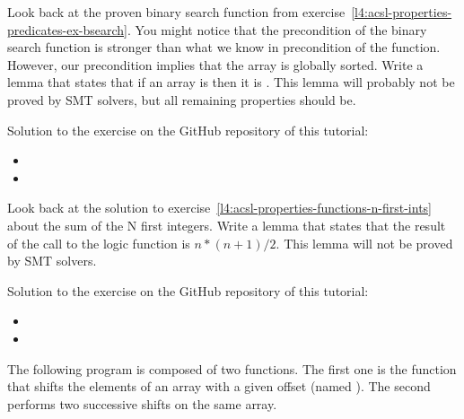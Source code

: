 

Look back at the proven binary search function from
exercise~\ref{l4:acsl-properties-predicates-ex-bsearch}. You might notice that
the precondition of the binary search function is stronger than what we know in
precondition of the  function. However, our precondition
implies that the array is globally sorted. Write a lemma that states that if
an array is  then it is .
This lemma will probably not be proved by SMT solvers, but all remaining properties
should be.


\begin{Information}
  Solution to the exercise on the GitHub repository of this tutorial:
  \begin{itemize}
    \item {}
    \item {}
  \end{itemize}
\end{Information}


\label{l4:acsl-properties-lemmas-n-first-ints}

Look back at the solution to
exercise~\ref{l4:acsl-properties-functions-n-first-ints} about the sum of the
N first integers. Write a lemma that states that the result of the call to the
logic function is $n*(n+1)/2$. This lemma will not be proved by SMT solvers.


\begin{Information}
  Solution to the exercise on the GitHub repository of this tutorial:
  \begin{itemize}
    \item {}
    \item {}
  \end{itemize}
\end{Information}


\label{l4:acsl-properties-lemmas-shift-trans}


The following program is composed of two functions. The first one is the
 function that shifts the elements of an array with a
given offset (named ). The second performs two successive
shifts on the same array.


